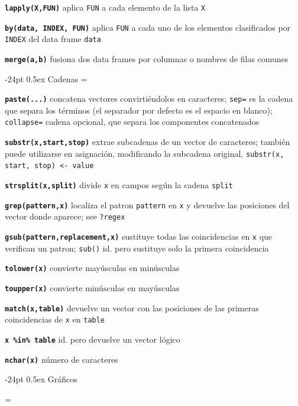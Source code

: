 \documentclass[10pt,landscape]{article}
\makeatletter
\renewcommand\section{\@startsection{section}{1}{0mm}%
                                     {-24pt}%
                                     {0.5ex}%
                                {\color[rgb]{1,0.54902,0}\normalfont\large\bfseries}}
\newcommand{\code}{\texttt}
\newcommand{\bcode}[1]{\texttt{\textbf{#1}}}
\makeatother
\begin{document}
\begin{multicols*}{3}
\bcode{lapply(X,FUN)} aplica \code{FUN} a cada elemento de la lista \code{X}

\bcode{by(data, INDEX, FUN)} aplica \code{FUN} a cada uno de los elementos clasificados por \code{INDEX} del data frame \code{data} 

\bcode{merge(a,b)} fusiona dos data frames por columnas o nombres de filas comunes




\section{Cadenas}
\everypar={\hangindent=9mm}

\bcode{paste(...)} concatena vectores convirtiéndolos en caracteres;
\code{sep=} es la cadena que separa los términos (el separador por defecto es el espacio en blanco);
\code{collapse=} cadena opcional, que separa los componentes concatenados

\bcode{substr(x,start,stop)} extrae subcadenas de un vector de caracteres; también puede utilizarse en asignación, modificando la subcadena original, \code{substr(x, start, stop) <- value}

\bcode{strsplit(x,split)} divide \code{x} en campos según la cadena \code{split}

\bcode{grep(pattern,x)} localiza el patron \code{pattern}
     en \code{x} y devuelve las posiciones del vector donde aparece; see \code{?regex}

\bcode{gsub(pattern,replacement,x)} sustituye todas las coincidencias en \code{x} que verifican un patron; \code{sub()} id. pero sustituye solo la primera coincidencia  

\bcode{tolower(x)} convierte mayúsculas en minúsculas

\bcode{toupper(x)} convierte minúsculas en mayúsculas

\bcode{match(x,table)} devuelve un vector con las posiciones de las primeras coincidencias de \code{x} en \code{table}

\bcode{x \%in\% table} id. pero devuelve un vector lógico

\bcode{nchar(x)} número de caracteres




\section{Gráficos}

\everypar={\hangindent=9mm}


\end{multicols*}
\end{document}
